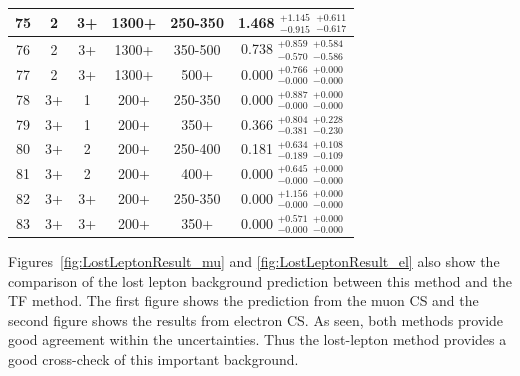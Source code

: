 \begin{table}[htbp]
\begin{centering}
\begin{tabular}{|c|c|c|c|c||c|}
\hline
75 &               2 &              3+ &           1300+ &         250-350 & 1.468 $^{+1.145}_{-0.915}$ $^{+0.611}_{-0.617}$ \\ 
\hline
76 &               2 &              3+ &           1300+ &         350-500 & 0.738 $^{+0.859}_{-0.570}$ $^{+0.584}_{-0.586}$ \\ 
\hline
77 &               2 &              3+ &           1300+ &            500+ & 0.000 $^{+0.766}_{-0.000}$ $^{+0.000}_{-0.000}$ \\ 
\hline
78 &              3+ &               1 &            200+ &         250-350 & 0.000 $^{+0.887}_{-0.000}$ $^{+0.000}_{-0.000}$ \\ 
\hline
79 &              3+ &               1 &            200+ &            350+ & 0.366 $^{+0.804}_{-0.381}$ $^{+0.228}_{-0.230}$ \\ 
\hline
80 &              3+ &               2 &            200+ &         250-400 & 0.181 $^{+0.634}_{-0.189}$ $^{+0.108}_{-0.109}$ \\ 
\hline
81 &              3+ &               2 &            200+ &            400+ & 0.000 $^{+0.645}_{-0.000}$ $^{+0.000}_{-0.000}$ \\ 
\hline
82 &              3+ &              3+ &            200+ &         250-350 & 0.000 $^{+1.156}_{-0.000}$ $^{+0.000}_{-0.000}$ \\ 
\hline
83 &              3+ &              3+ &            200+ &            350+ & 0.000 $^{+0.571}_{-0.000}$ $^{+0.000}_{-0.000}$ \\ 
\hline
\end{tabular}
\par\end{centering}
\end{table}

Figures~\ref{fig:LostLeptonResult_mu} and \ref{fig:LostLeptonResult_el} also show the comparison of the lost lepton background prediction between this method and the TF method. The first figure shows the prediction from the muon CS and the second figure shows the results from electron CS. As seen, both methods provide good agreement within the uncertainties. Thus the lost-lepton method provides a good cross-check of this important background.
